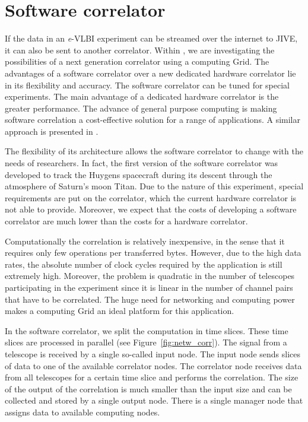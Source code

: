 \section{Software correlator}\label{sec:softwarecorrelation}
If the data in an {\it e}-VLBI experiment can be streamed over the
internet to JIVE, it can also be sent to another correlator. Within
\scarie, we are investigating the possibilities of a next generation
correlator using a computing Grid. The advantages of a software
correlator over a new dedicated hardware correlator lie in its
flexibility and accuracy. The software correlator can be tuned for
special experiments. The main advantage of a dedicated hardware
correlator is the greater performance. The advance of general purpose
computing is making software correlation a cost-effective solution for
a range of applications. A similar approach is presented in
\cite{deller-2007}.

The flexibility of its architecture allows the software correlator to
change with the needs of researchers. In fact, the first version of
the software correlator was developed to track the Huygens spacecraft
during its descent through the atmosphere of Saturn's moon Titan. Due
to the nature of this experiment, special requirements are put on the
correlator, which the current hardware correlator is not able to
provide.  Moreover, we expect that the costs of developing a software
correlator are much lower than the costs for a hardware correlator.


Computationally the correlation is relatively inexpensive, in the
sense that it requires only few operations per transferred bytes.
However, due to the high data rates, the absolute number of clock
cycles required by the application is still extremely high. Moreover,
the problem is quadratic in the number of telescopes participating in
the experiment since it is linear in the number of channel pairs that
have to be correlated. The huge need for networking and computing
power makes a computing Grid an ideal platform for this application.

In the software correlator, we split the computation in time slices.
These time slices are processed in parallel (see
Figure~\ref{fig:netw_corr}). The signal from a telescope is received
by a single so-called input node.  The input node sends slices of data
to one of the available correlator nodes. The correlator node receives
data from all telescopes for a certain time slice and performs the
correlation. The size of the output of the correlation is much smaller
than the input size and can be collected and stored by a single output
node.  There is a single manager node that assigns data to available
computing nodes.



